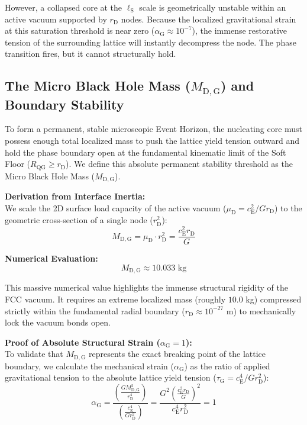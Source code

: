 However, a collapsed core at the $\ell_{\mathrm{S}}$ scale is geometrically unstable within an active vacuum supported by $r_{\mathrm{D}}$ nodes. Because the localized gravitational strain at this saturation threshold is near zero ($\alpha_{\mathrm{G}} \approx 10^{-7}$), the immense restorative tension of the surrounding lattice will instantly decompress the node. The phase transition fires, but it cannot structurally hold.

\subsection{The Micro Black Hole Mass ($M_{\mathrm{D,G}}$) and Boundary Stability}
To form a permanent, stable microscopic Event Horizon, the nucleating core must possess enough total localized mass to push the lattice yield tension outward and hold the phase boundary open at the fundamental kinematic limit of the Soft Floor ($R_{\mathrm{QG}} \ge r_{\mathrm{D}}$). We define this absolute permanent stability threshold as the Micro Black Hole Mass ($M_{\mathrm{D,G}}$).

\vspace{0.5em}
\noindent\textbf{Derivation from Interface Inertia:}\\
We scale the 2D surface load capacity of the active vacuum ($\mu_{\mathrm{D}} = c_{\mathrm{E}}^2 / G r_{\mathrm{D}}$) to the geometric cross-section of a single node ($r_{\mathrm{D}}^2$):
\begin{equation}
    M_{\mathrm{D,G}} = \mu_{\mathrm{D}} \cdot r_{\mathrm{D}}^2 = \frac{c_{\mathrm{E}}^2 r_{\mathrm{D}}}{G}
\end{equation}

\vspace{0.5em}
\noindent\textbf{Numerical Evaluation:}
\begin{equation}
    M_{\mathrm{D,G}} \approx 10.033 \text{ kg}
\end{equation}

This massive numerical value highlights the immense structural rigidity of the FCC vacuum. It requires an extreme localized mass (roughly $10.0$ kg) compressed strictly within the fundamental radial boundary ($r_{\mathrm{D}} \approx 10^{-27}$ m) to mechanically lock the vacuum bonds open.

\vspace{0.5em}
\noindent\textbf{Proof of Absolute Structural Strain ($\alpha_{\mathrm{G}} = 1$):}\\
To validate that $M_{\mathrm{D,G}}$ represents the exact breaking point of the lattice boundary, we calculate the mechanical strain ($\alpha_{\mathrm{G}}$) as the ratio of applied gravitational tension to the absolute lattice yield tension ($\tau_{\mathrm{G}} = c_{\mathrm{E}}^4 / G r_{\mathrm{D}}^2$):
\begin{equation}
    \alpha_{\mathrm{G}} = \frac{\left( \frac{G M_{\mathrm{D,G}}^2}{r_{\mathrm{D}}^4} \right)}{\left( \frac{c_{\mathrm{E}}^4}{G r_{\mathrm{D}}^2} \right)} = \frac{G^2 \left( \frac{c_{\mathrm{E}}^2 r_{\mathrm{D}}}{G} \right)^2}{c_{\mathrm{E}}^4 r_{\mathrm{D}}^2} = 1
\end{equation}

